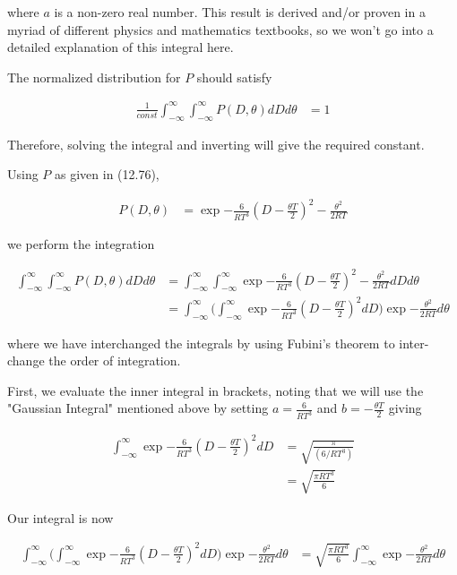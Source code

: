 \documentclass{article}
\begin{document}
where $a$ is a non-zero real number. This result is derived and/or proven in a myriad of different physics and mathematics textbooks, so we won't go into a detailed explanation of this integral here. 

The normalized distribution for $P$ should satisfy 

\begin{align*}
    \frac{1}{const} \int_{-\infty}^{\infty} \int_{-\infty}^{\infty} P(D,\theta)dD d\theta &= 1    
\end{align*}

Therefore, solving the integral and inverting will give the required constant. 

Using $P$ as given in (12.76), 

\begin{align*}
    P(D, \theta) &= \exp{-\frac{6}{RT^3}(D - \frac{\theta T}{2})^2 - \frac{\theta ^2}{2RT} }
\end{align*}

we perform the integration 

\begin{align*}
    \int_{-\infty}^{\infty} \int_{-\infty}^{\infty} P(D,\theta)dD d\theta &= \int_{-\infty}^{\infty} \int_{-\infty}^{\infty} \exp{-\frac{6}{RT^3}(D - \frac{\theta T}{2})^2 - \frac{\theta ^2}{2RT} } dD d\theta \\
    & = \int_{-\infty}^{\infty} \Big( \int_{-\infty}^{\infty} \exp{-\frac{6}{RT^3}(D - \frac{\theta T}{2})^2 } dD \Big) \exp{ - \frac{\theta ^2}{2RT} } d\theta 
\end{align*}

where we have interchanged the integrals by using Fubini's theorem to inter-change the order of integration. 

First, we evaluate the inner integral in brackets, noting that we will use the "Gaussian Integral" mentioned above by setting $a = \frac{6}{RT^3}$ and $b = -\frac{\theta T}{2}$ giving 

\begin{align*}
    \int_{-\infty}^{\infty} \exp{-\frac{6}{RT^3}(D - \frac{\theta T}{2})^2 } dD &= \sqrt{\frac{\pi}{(6 / RT^3)}} \\
    &= \sqrt{\frac{\pi RT^3}{6 }}
\end{align*}

Our integral is now

\begin{align*}
    \int_{-\infty}^{\infty} \Big( \int_{-\infty}^{\infty} \exp{-\frac{6}{RT^3}(D - \frac{\theta T}{2})^2 } dD \Big) \exp{ - \frac{\theta ^2}{2RT} } d\theta &= \sqrt{\frac{\pi RT^3}{6 }} \int_{-\infty}^{\infty} \exp{ - \frac{\theta ^2}{2RT} } d\theta   
\end{align*}
\end{document}
